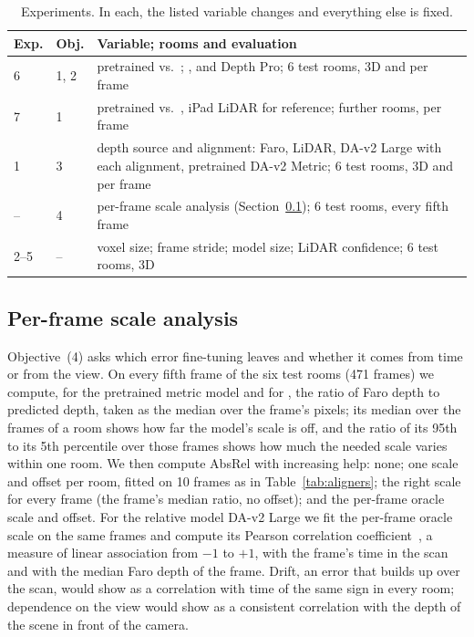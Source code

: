 \begin{table}[t]
\centering\small
\caption{Experiments. In each, the listed variable changes and everything else is fixed.}
\label{tab:exps}
\begin{tabularx}{\columnwidth}{@{}ll>{\raggedright\arraybackslash}X@{}}
\toprule
Exp. & Obj. & Variable; rooms and evaluation \\
\midrule
6 & 1, 2 & pretrained vs.\ \ftmain{}; \ftfaro{}, \ftlidar{} and Depth Pro; 6 test rooms, 3D and per frame \\
7 & 1 & pretrained vs.\ \ftmain{}, iPad LiDAR for reference; \rsVN{} further rooms, per frame \\
1 & 3 & depth source and alignment: Faro, LiDAR, DA-v2 Large with each alignment, pretrained DA-v2 Metric; 6 test
rooms, 3D and per frame \\
-- & 4 & per-frame scale analysis (Section~\ref{sec:scaleanalysis}); 6 test rooms, every fifth frame \\
2--5 & -- & voxel size; frame stride; model size; LiDAR confidence; 6 test rooms, 3D \\
\bottomrule
\end{tabularx}
\end{table}

\subsection{Per-frame scale analysis}\label{sec:scaleanalysis}
Objective~(4) asks which error fine-tuning leaves and whether it comes from time or from the view. On every fifth
frame of the six test rooms (471 frames) we compute, for the pretrained metric model and for \ftmain{}, the ratio of
Faro depth to predicted depth, taken as the median over the frame's pixels; its median over the frames of a room shows
how far the model's scale is off, and the ratio of its 95th to its 5th percentile over those frames shows how much the
needed scale varies within one room. We then compute AbsRel with increasing help: none; one scale and offset per room,
fitted on 10 frames as in Table~\ref{tab:aligners}; the right scale for every frame (the frame's median ratio, no
offset); and the per-frame oracle scale and offset. For the relative model DA-v2 Large we fit the per-frame oracle scale
on the same frames and compute its Pearson correlation coefficient~\cite{pearson}, a measure of linear association from
$-1$ to $+1$, with the frame's time in the scan and with the median Faro depth of the frame. Drift, an error that builds
up over the scan, would show as a correlation with time of the same sign in every room; dependence on the view would
show as a consistent correlation with the depth of the scene in front of the camera.
